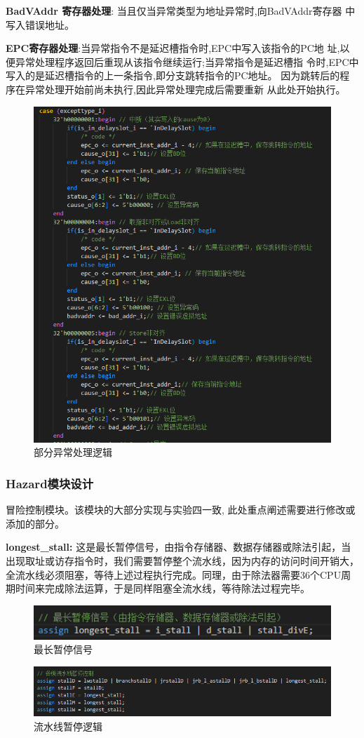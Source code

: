 \textbf{BadVAddr 寄存器处理}: 当且仅当异常类型为地址异常时,向BadVAddr寄存器 中写入错误地址。

\textbf{EPC寄存器处理}:当异常指令不是延迟槽指令时,EPC中写入该指令的PC地 址,以便异常处理程序返回后重现从该指令继续运行;当异常指令是延迟槽指 令时,EPC中写入的是延迟槽指令的上一条指令,即分支跳转指令的PC地址。 因为跳转后的程序在异常处理开始前尚未执行,因此异常处理完成后需要重新 从此处开始执行。 
\begin{figure}[h]
\centering
\includegraphics[width=0.5\linewidth]{image/p8.png}
\caption{部分异常处理逻辑}
\label{fig:enter-label}
\end{figure}

\subsubsection{Hazard模块设计}
冒险控制模块。该模块的大部分实现与实验四一致, 此处重点阐述需要进行修改或添加的部分。

\textbf{longest\_stall:}
这是最长暂停信号，由指令存储器、数据存储器或除法引起，当出现取址或访存指令时，我们需要暂停整个流水线，因为内存的访问时间开销大，全流水线必须阻塞，等待上述过程执行完成。同理，由于除法器需要36个CPU周期时间来完成除法运算，于是同样阻塞全流水线，等待除法过程完毕。
\begin{figure}[h]
\centering
\includegraphics[width=1\linewidth]{image/hazard1.png}
\caption{最长暂停信号}
\label{fig:enter-label}
\end{figure}

\begin{figure}[h]
\centering
\includegraphics[width=1\linewidth]{image/hazard2.png}
\caption{流水线暂停逻辑}
\label{fig:enter-label}
\end{figure}


